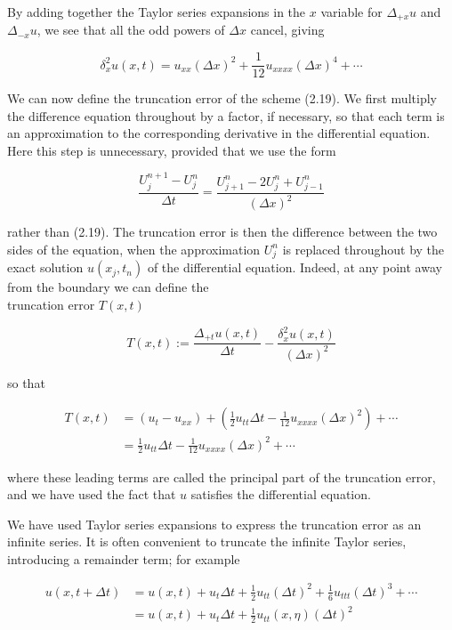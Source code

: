 \documentclass[10pt]{article}
\begin{document}
By adding together the Taylor series expansions in the \(x\) variable for \(\Delta_{+x} u\) and \(\Delta_{-x} u\), we see that all the odd powers of \(\Delta x\) cancel, giving

\[
\delta_{x}^{2} u(x, t)=u_{x x}(\Delta x)^{2}+\frac{1}{12} u_{x x x x}(\Delta x)^{4}+\cdots
\]

We can now define the truncation error of the scheme (2.19). We first multiply the difference equation throughout by a factor, if necessary, so that each term is an approximation to the corresponding derivative in the differential equation. Here this step is unnecessary, provided that we use the form

\[
\frac{U_{j}^{n+1}-U_{j}^{n}}{\Delta t}=\frac{U_{j+1}^{n}-2 U_{j}^{n}+U_{j-1}^{n}}{(\Delta x)^{2}}
\]

rather than (2.19). The truncation error is then the difference between the two sides of the equation, when the approximation \(U_{j}^{n}\) is replaced throughout by the exact solution \(u\left(x_{j}, t_{n}\right)\) of the differential equation. Indeed, at any point away from the boundary we can define the\\
truncation error \(T(x, t)\)

\[
T(x, t):=\frac{\Delta_{+t} u(x, t)}{\Delta t}-\frac{\delta_{x}^{2} u(x, t)}{(\Delta x)^{2}}
\]

so that

\[
\begin{aligned}
T(x, t) & =\left(u_{t}-u_{x x}\right)+\left(\frac{1}{2} u_{t t} \Delta t-\frac{1}{12} u_{x x x x}(\Delta x)^{2}\right)+\cdots \\
& =\frac{1}{2} u_{t t} \Delta t-\frac{1}{12} u_{x x x x}(\Delta x)^{2}+\cdots
\end{aligned}
\]

where these leading terms are called the principal part of the truncation error, and we have used the fact that \(u\) satisfies the differential equation.

We have used Taylor series expansions to express the truncation error as an infinite series. It is often convenient to truncate the infinite Taylor series, introducing a remainder term; for example

\[
\begin{aligned}
u(x, t+\Delta t) & =u(x, t)+u_{t} \Delta t+\frac{1}{2} u_{t t}(\Delta t)^{2}+\frac{1}{6} u_{t t t}(\Delta t)^{3}+\cdots \\
& =u(x, t)+u_{t} \Delta t+\frac{1}{2} u_{t t}(x, \eta)(\Delta t)^{2}
\end{aligned}
\]
\end{document}
